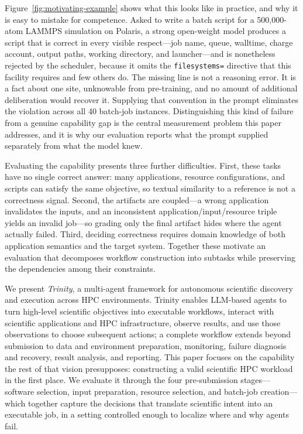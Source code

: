 \documentclass[conference]{IEEEtran}
\begin{document}
Figure~\ref{fig:motivating-example} shows what this looks like in practice, and why it is easy to
mistake for competence. Asked to write a batch script for a 500,000-atom LAMMPS simulation on
Polaris, a strong open-weight model produces a script that is correct in every visible
respect---job name, queue, walltime, charge account, output paths, working directory, and
launcher---and is nonetheless rejected by the scheduler, because it omits the
\texttt{filesystems=} directive that this facility requires and few others do. The missing line is
not a reasoning error. It is a fact about one site, unknowable from pre-training, and no amount of
additional deliberation would recover it. Supplying that convention in the prompt eliminates the
violation across all 40 batch-job instances. Distinguishing this kind of failure from a genuine
capability gap is the central measurement problem this paper addresses, and it is why our
evaluation reports what the prompt supplied separately from what the model knew.

Evaluating the capability presents three further difficulties. First, these tasks have no single
correct answer: many applications, resource configurations, and scripts can satisfy the same
objective, so textual similarity to a reference is not a correctness signal. Second, the artifacts
are coupled---a wrong application invalidates the inputs, and an inconsistent
application/input/resource triple yields an invalid job---so grading only the final artifact hides
where the agent actually failed. Third, deciding correctness requires domain knowledge of both
application semantics and the target system. Together these motivate an evaluation that decomposes
workflow construction into subtasks while preserving the dependencies among their constraints.

We present \textit{Trinity}, a multi-agent framework for autonomous scientific discovery and
execution across HPC environments. Trinity enables LLM-based agents to turn high-level scientific
objectives into executable workflows, interact with scientific applications and HPC infrastructure,
observe results, and use those observations to choose subsequent actions; a complete workflow
extends beyond submission to data and environment preparation, monitoring, failure diagnosis and
recovery, result analysis, and reporting. This paper focuses on the capability the rest of that
vision presupposes: constructing a valid scientific HPC workload in the first place. We evaluate it
through the four pre-submission stages---software selection, input preparation, resource selection,
and batch-job creation---which together capture the decisions that translate scientific intent into
an executable job, in a setting controlled enough to localize where and why agents fail.
\end{document}
